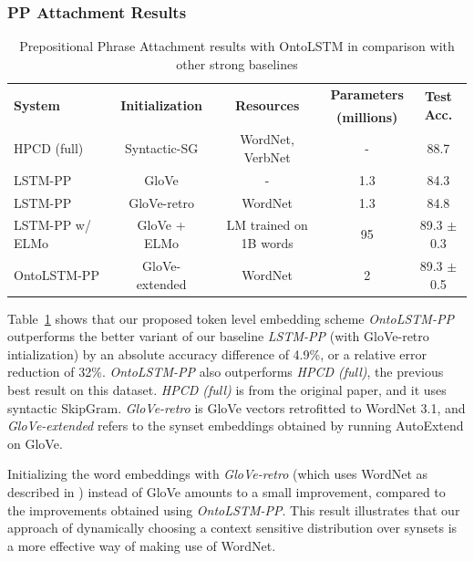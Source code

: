 \subsubsection{PP Attachment Results}\label{sec:ontolstm_pp_results}
\begin{table}
	\centering
	\begin{tabular}{lcccc}
		\toprule
		\multirow{2}{*}{\textbf{System}} &
		\multirow{2}{*}{\textbf{Initialization}} &
		\multirow{2}{*}{\textbf{Resources}} & \textbf{Parameters} & 
		\multirow{2}{*}{\textbf{Test Acc.}}\\
		& & & \textbf{(millions)} & \\
		\midrule
		HPCD (full) & Syntactic-SG & WordNet, VerbNet & - & 88.7 \\
		\midrule
		LSTM-PP & GloVe & - & 1.3 & 84.3 \\
		LSTM-PP & GloVe-retro & WordNet & 1.3 & 84.8 \\
		LSTM-PP w/ ELMo & GloVe + ELMo & LM trained on 1B words &
		95 & 89.3 $\pm$ 0.3 \\
		OntoLSTM-PP & GloVe-extended & WordNet & 2 & 89.3 $\pm$ 0.5 \\
		\bottomrule
	\end{tabular}
	\caption{Prepositional Phrase Attachment results with OntoLSTM in
	comparison with other strong baselines}\label{tab:ontolstm_direct_ppa_results}
\end{table}

Table~\ref{tab:ontolstm_direct_ppa_results} shows that our proposed token level
embedding scheme \textit{OntoLSTM-PP} outperforms the better variant of our
baseline \textit{LSTM-PP} (with GloVe-retro intialization) by an absolute
accuracy difference of 4.9\%, or a relative error reduction of 32\%.
\textit{OntoLSTM-PP} also outperforms \textit{HPCD (full)}, the previous best
result on this dataset. \textit{HPCD (full)} is from the original paper, and it
uses syntactic SkipGram. \textit{GloVe-retro} is GloVe vectors retrofitted
\citep{faruqui:15} to WordNet 3.1, and \textit{GloVe-extended} refers to the
synset embeddings obtained by running AutoExtend \citep{rothe:15} on GloVe.

Initializing the word embeddings with \textit{GloVe-retro} (which uses WordNet
as described in \cite{faruqui:15}) instead of GloVe amounts to a small
improvement, compared to the improvements obtained using \textit{OntoLSTM-PP}.
This result illustrates that our approach of dynamically choosing a context
sensitive distribution over synsets is a more effective way of making use of
WordNet.

